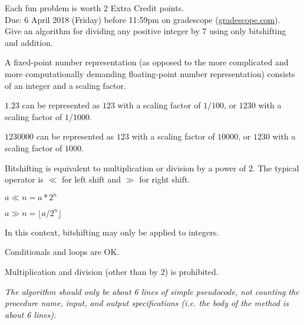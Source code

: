 \documentclass{article}
\theoremstyle{definition}
\begin{document}
\noindent
Each fun problem is worth 2 Extra Credit points.\\
Due: 6 April 2018 (Friday) before 11:59pm on gradescope (\url{gradescope.com}).\\

\noindent
Give an algorithm for dividing any positive integer by 7 using only bitshifting and addition.
\begin{compactitem}
\item A fixed-point number representation (as opposed to the more complicated and more computationally demanding floating-point number representation) consists of an integer and a scaling factor. 
\begin{compactitem}
\item $1.23$ can be represented as $123$ with a scaling factor of $1/100$, or $1230$ with a scaling factor of $1/1000$.
\item $1230000$ can be represented as $123$ with a scaling factor of $10000$, or $1230$ with a scaling factor of $1000$. 
\end{compactitem}
\item Bitshifting is equivalent to multiplication or division by a power of 2.  The typical operator is $\ll$ for left shift and $\gg$ for right shift.
\begin{compactitem}
\item $a\ll n = a*2^n$
\item $a \gg n = \lfloor a/2^n\rfloor$
\item In this context, bitshifting may only be applied to integers.
\end{compactitem}
\item Conditionals and loops are OK.
\item Multiplication and division (other than by 2) is prohibited.
\end{compactitem}

\noindent
\textit{The algorithm should only be about 6 lines of simple pseudocode, not counting the procedure name, input, and output specifications (i.e. the body of the method is about 6 lines).}
\end{document}
